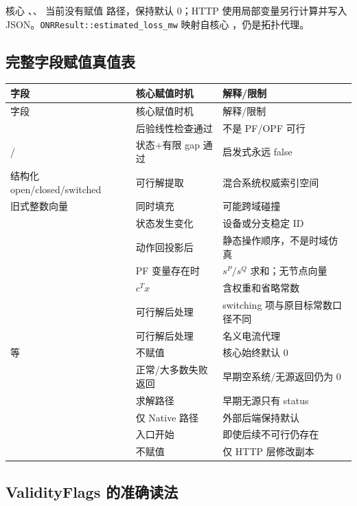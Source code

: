 核心 、、 当前没有赋值
路径，保持默认 0；HTTP 使用局部变量另行计算并写入 JSON。\texttt{ONRResult::estimated\_loss\_mw}
映射自核心 ，仍是拓扑代理。

\subsection{完整字段赋值真值表}

\begin{longtable}{@{}L{4.2cm}L{4.0cm}L{6.4cm}@{}}
\toprule
字段 & 核心赋值时机 & 解释/限制\\
\midrule
\endfirsthead
\toprule
字段 & 核心赋值时机 & 解释/限制\\
\midrule
\endhead
{} & 后验线性检查通过 & 不是 PF/OPF 可行\\
/ & 状态+有限 gap 通过 & 启发式永远 false\\
结构化 open/closed/switched & 可行解提取 & 混合系统权威索引空间\\
旧式整数向量 & 同时填充 & 可能跨域碰撞\\
 & 状态发生变化 & 设备或分支稳定 ID\\
 & 动作回投影后 & 静态操作顺序，不是时域仿真\\
 & PF 变量存在时 & $s^P/s^Q$ 求和；无节点向量\\
 & $c^Tx$ & 含权重和省略常数\\
 & 可行解后处理 & switching 项与原目标常数口径不同\\
 & 可行解后处理 & 名义电流代理\\
 等 & 不赋值 & 核心始终默认 0\\
 & 正常/大多数失败返回 & 早期空系统/无源返回仍为 0\\
 & 求解路径 & 早期无源只有 status\\
 & 仅 Native 路径 & 外部后端保持默认\\
 & 入口开始 & 即使后续不可行仍存在\\
 & 不赋值 & 仅 HTTP 层修改副本\\
\bottomrule
\end{longtable}

\subsection{ValidityFlags 的准确读法}


